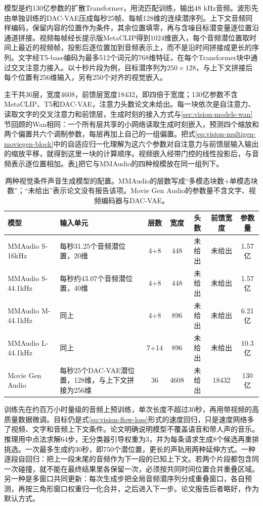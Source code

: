 模型是约130亿参数的扩散Transformer，用流匹配训练，输出48 kHz音频。波形先由单独训练的DAC-VAE压成每秒25帧、每帧128维的连续潜序列。上下文音频同样编码，保留内容的位置作为条件，其余位置填零，再与含噪目标潜变量逐位置沿通道拼接。视频每帧经长提示版MetaCLIP得到1024维嵌入，每个音频潜位置取时间上最近的视频帧，投影后逐位置加到音频表示上，而不是沿时间拼接成更长的序列。文字经T5-base编码为最多512个词元的768维特征，在每个Transformer块中通过交叉注意力接入。以十秒片段为例，目标潜序列为$250\times128$，与上下文拼接后每个位置有256维输入，另有250个对齐的视觉嵌入。

主干共36层，宽度4608，前馈层宽度18432，即四倍于宽度；130亿参数不含MetaCLIP、T5和DAC-VAE，注意力头数论文未给出。每一块依次是自注意力、读取文字的交叉注意力和前馈层，生成时刻的接入方式与\ref{sec:vision-models-wan}节回顾的Wan相同：一个所有层共享的小网络读取生成时刻嵌入，预测四个缩放和两个偏置共六个调制参数，每层再加上自己的一组偏置。把式\eqref{eq:vision-multigen-moviegen-block}中的自适应归一化理解为这六个参数对自注意力与前馈层输入输出的缩放平移，就得到这里一块的计算顺序。视频嵌入经带门控的线性投影后，与音频表示逐位置相加。表\ref{tab:vision-multigen-audio-config}把它与MMAudio的四种规模放在同一组列下。

\begin{table}[tbp]
 \centering
 \small
 \begin{tabularx}{\linewidth}{@{}p{28mm}Xccccc@{}}
  \toprule
  模型 & 输入单元 & 层数 & 宽度 & 头数 & 前馈宽度 & 参数量 \\
  \midrule
  MMAudio S-16kHz & 每秒31.25个音频潜位置，20维 & 4+8 & 448 & 未给出 & 未给出 & 1.57亿 \\
  MMAudio S-44.1kHz & 每秒约43.07个音频潜位置，40维 & 4+8 & 448 & 未给出 & 未给出 & 1.57亿 \\
  MMAudio M-44.1kHz & 同上 & 4+8 & 896 & 未给出 & 未给出 & 6.21亿 \\
  MMAudio L-44.1kHz & 同上 & 7+14 & 896 & 未给出 & 未给出 & 10.3亿 \\
  Movie Gen Audio & 每秒25个DAC-VAE潜位置，128维，与上下文拼接为256维 & 36 & 4608 & 未给出 & 18432 & 130亿 \\
  \bottomrule
 \end{tabularx}
 \caption{两种视觉条件声音生成模型的配置。MMAudio的层数写成“多模态块数+单模态块数”；“未给出”表示论文没有报告该项。Movie Gen Audio的参数量不含文字、视频编码器与DAC-VAE。}
 \label{tab:vision-multigen-audio-config}
\end{table}
\FloatBarrier

训练先在约百万小时量级的音频上预训练，单次长度不超过30秒，再用带视频的高质量数据微调。目标仍是式\eqref{eq:vision-flow-loss}形式的速度回归，只是速度网络多了视频、文字和音频上下文条件。论文明确说明模型不覆盖语音和带人声的音乐。推理用中点法求解64步，无分类器引导权重为3，并为每条请求生成8个候选再重排挑选。一次最多生成约30秒，即750个潜位置，更长的声轨用两种延伸方式。一种逐段自回归：把上一段末尾的音频作为下一段的已知上下文。若两个片段都包含同一次碰撞，就不能在最终结果里各保留一次，必须按共同时间位置合并重叠区域。另一种是多窗口共同更新：每次生成步把全局音频潜序列分成重叠窗口，各自预测，再按三角形窗口权重归一化合并，之后进入下一步。论文报告后者略好，作为默认方式。


